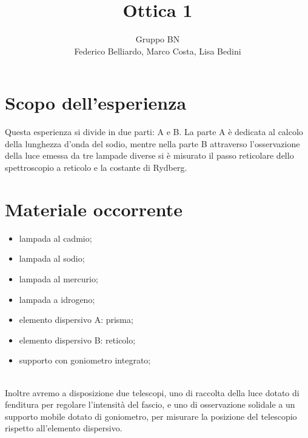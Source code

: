 \documentclass[10pt,a4paper]{article}
\author{Gruppo BN \\ Federico Belliardo, Marco Costa, Lisa Bedini}
\title{Ottica 1}
\begin{document}
\maketitle
\section{Scopo dell'esperienza}
Questa esperienza si divide in due parti: A e B.
La parte A è dedicata al calcolo della lunghezza d'onda del sodio, mentre nella parte B attraverso l'osservazione della luce emessa da tre lampade diverse si è misurato il passo reticolare dello spettroscopio a reticolo e la costante di Rydberg.

\section{Materiale occorrente}
\begin{itemize}
\item lampada al cadmio;
\item lampada al sodio;
\item lampada al mercurio;
\item lampada a idrogeno;
\item elemento dispersivo A: prisma;
\item elemento dispersivo B: reticolo;
\item supporto con goniometro integrato;
\end{itemize}
\\
Inoltre avremo a disposizione due telescopi, uno di raccolta della luce dotato di fenditura per regolare l'intensità del fascio, e uno di osservazione solidale a un supporto mobile dotato di goniometro, per misurare la posizione del telescopio rispetto all'elemento dispersivo.
\end{document}
